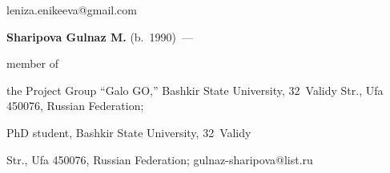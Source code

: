   \mbox{leniza.enikeeva@gmail.com}





   \vspace*{3pt}


  


  \noindent


\textbf{Sharipova Gulnaz M.} (b.\ 1990)~--- 


member of


  the Project Group ``Galo GO,'' Bashkir State University, 32~Validy Str., Ufa 450076, Russian Federation;


  PhD student, Bashkir State University, 32~Validy 


Str., Ufa 450076, Russian Federation; \mbox{gulnaz-sharipova@list.ru}


  


\label{end\stat}








\renewcommand{\bibname}{\protect\rm Литература}


